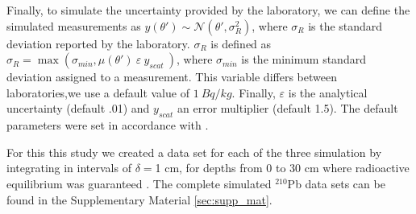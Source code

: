 \documentclass [10pt] {article}
\newcommand{\ac}{\color{red} }  %
\newcommand{\ca}{\color{black}} %
\newcommand{\ma}{\color{blue} }  %
\begin{document}
	Finally, to simulate the uncertainty provided by the laboratory, we can define the simulated measurements as  $y(\theta')\sim\mathcal{N}\left(\theta',\sigma_R^2\right)$, where $\sigma_R$ is the standard deviation reported by the laboratory. 
$\sigma_R$ is defined as $\sigma_R= \max \left(\sigma_{min}, \mu(\theta')~\varepsilon~y_{scat}~\right)$, where $\sigma_{min}$ is the minimum standard deviation assigned to a measurement. This variable differs between laboratories,we use a default value of $1~ Bq/kg$. 
Finally, $\varepsilon$ is the analytical uncertainty (default .01) and $y_{scat}$ an error multiplier (default 1.5).
The default parameters were set in accordance with \citet{Blaauw2018}.

For this this study we created a data set for each of the three simulation by integrating in intervals of $\delta =$1 cm, for depths from  0 to 30 cm where radioactive equilibrium was guaranteed \citep{Aquino2018}.
The complete simulated $^{210}$Pb data sets can be found in the Supplementary Material \ref{sec:supp_mat}.





\end{document}
